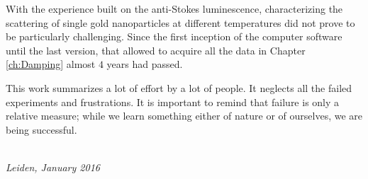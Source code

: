 With the experience built on the anti-Stokes luminescence, characterizing the
scattering of single gold nanoparticles at different temperatures did not prove
to be particularly challenging. Since the first inception of the computer
software until the last version, that allowed to acquire all the data in Chapter
\ref{ch:Damping} almost $4$ years had passed. 

This work summarizes a lot of effort by a lot of people. It neglects all the
failed experiments and frustrations. It is important to remind that failure is
only a relative measure; while we learn something either of nature or of
ourselves, we are being successful. 

\begin{flushright}
{\makeatletter\itshape
    \@firstname\ \@lastname \\
    Leiden, January 2016
\makeatother}
\end{flushright}


